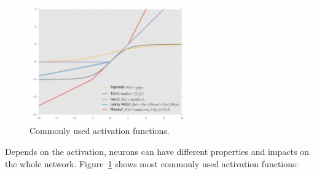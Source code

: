\begin{figure}[!htbp]
    \centering
    \includegraphics[width=0.6\textwidth]{figure/ch3-activations.pdf}
    \caption{Commonly used activation functions.}
    \label{fig:ch3-activations}
\end{figure}


Depends on the activation, neurons can have different properties and impacts on the whole network. Figure~\ref{fig:ch3-activations} shows most commonly used activation functions:

